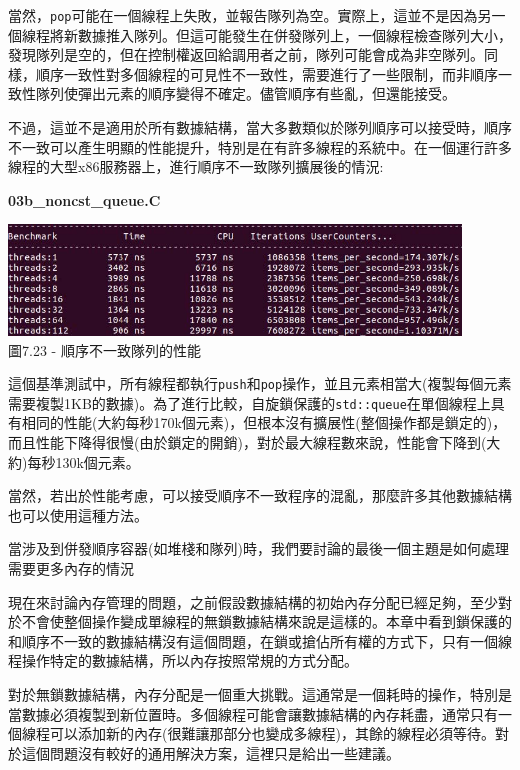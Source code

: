 當然，\texttt{pop}可能在一個線程上失敗，並報告隊列為空。實際上，這並不是因為另一個線程將新數據推入隊列。但這可能發生在併發隊列上，一個線程檢查隊列大小，發現隊列是空的，但在控制權返回給調用者之前，隊列可能會成為非空隊列。同樣，順序一致性對多個線程的可見性不一致性，需要進行了一些限制，而非順序一致性隊列使彈出元素的順序變得不確定。儘管順序有些亂，但還能接受。

不過，這並不是適用於所有數據結構，當大多數類似於隊列順序可以接受時，順序不一致可以產生明顯的性能提升，特別是在有許多線程的系統中。在一個運行許多線程的大型x86服務器上，進行順序不一致隊列擴展後的情況:

\noindent
\textbf{03b\_noncst\_queue.C}
\begin{center}
\includegraphics[width=0.9\textwidth]{content/2/chapter7/images/23.jpg}\\
圖7.23 - 順序不一致隊列的性能
\end{center}

這個基準測試中，所有線程都執行\texttt{push}和\texttt{pop}操作，並且元素相當大(複製每個元素需要複製1KB的數據)。為了進行比較，自旋鎖保護的\texttt{std::queue}在單個線程上具有相同的性能(大約每秒170k個元素)，但根本沒有擴展性(整個操作都是鎖定的)，而且性能下降得很慢(由於鎖定的開銷)，對於最大線程數來說，性能會下降到(大約)每秒130k個元素。

當然，若出於性能考慮，可以接受順序不一致程序的混亂，那麼許多其他數據結構也可以使用這種方法。

當涉及到併發順序容器(如堆棧和隊列)時，我們要討論的最後一個主題是如何處理需要更多內存的情況


現在來討論內存管理的問題，之前假設數據結構的初始內存分配已經足夠，至少對於不會使整個操作變成單線程的無鎖數據結構來說是這樣的。本章中看到鎖保護的和順序不一致的數據結構沒有這個問題，在鎖或搶佔所有權的方式下，只有一個線程操作特定的數據結構，所以內存按照常規的方式分配。

對於無鎖數據結構，內存分配是一個重大挑戰。這通常是一個耗時的操作，特別是當數據必須複製到新位置時。多個線程可能會讓數據結構的內存耗盡，通常只有一個線程可以添加新的內存(很難讓那部分也變成多線程)，其餘的線程必須等待。對於這個問題沒有較好的通用解決方案，這裡只是給出一些建議。

